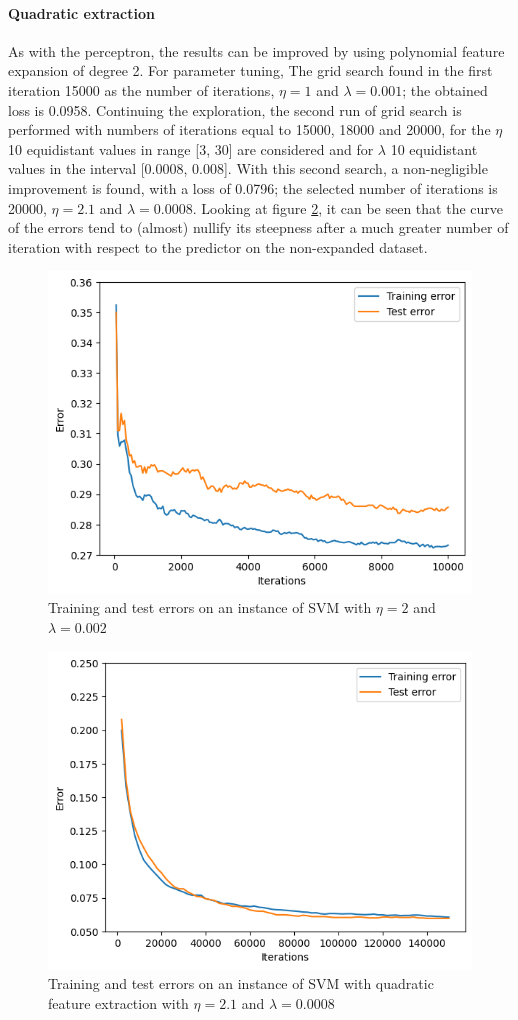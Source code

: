 \documentclass{article}
\begin{document}
\paragraph{Quadratic extraction}
As with the perceptron, the results can be improved by using polynomial feature expansion of degree 2. For parameter tuning, The grid search found in the first iteration 15000 as the number of iterations, $\eta=1$ and $\lambda=0.001$; the obtained loss is 0.0958. Continuing the exploration, the second run of grid search is performed with numbers of iterations equal to 15000, 18000 and 20000, for the $\eta$ 10 equidistant values in range [3, 30] are considered and for $\lambda$ 10 equidistant values in the interval [0.0008, 0.008]. With this second search, a non-negligible improvement is found, with a loss of 0.0796; the selected number of iterations is 20000, $\eta=2.1$ and $\lambda=0.0008$. Looking at figure \ref{fig:quad_svm}, it can be seen that the curve of the errors tend to (almost) nullify its steepness after a much greater number of iteration with respect to the predictor on the non-expanded dataset.
\begin{figure}
	\centering
	\includegraphics[width=0.5\columnwidth]{../plots/svm.png}
	\caption{Training and test errors on an instance of SVM with $\eta=2$ and $\lambda=0.002$}
	\label{fig:svm}
\end{figure}
\begin{figure}
	\centering
	\includegraphics[width=0.5\columnwidth]{../plots/quad_svm.png}
	\caption{Training and test errors on an instance of SVM with quadratic feature extraction with  $\eta=2.1$ and $\lambda=0.0008$}
	\label{fig:quad_svm}
\end{figure}
\end{document}
